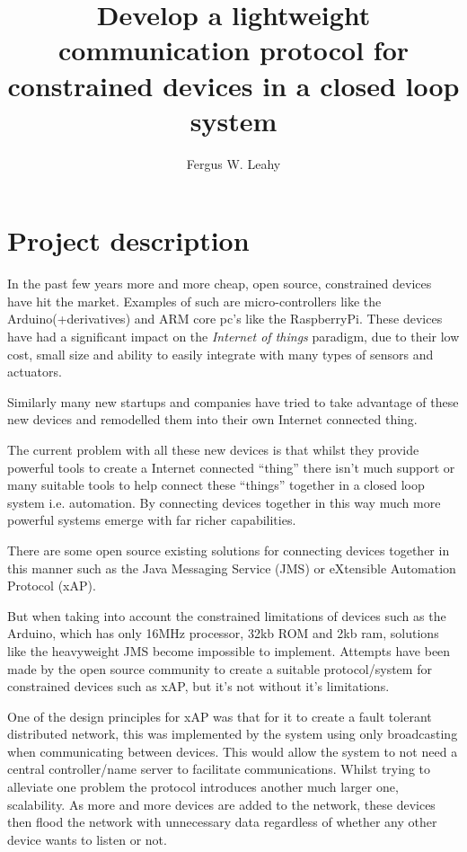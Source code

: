 \documentclass[a4paper,twocolumn]{article}
\title{Develop a lightweight communication protocol for constrained devices in a closed loop system}
\author{Fergus W. Leahy}
\begin{document}
\maketitle

\section{Project description} %
\label{sec:project_description}
In the past few years more and more cheap, open source, constrained devices have hit the market. Examples of such are micro-controllers like the Arduino(+derivatives)\cite{arduino} and ARM core pc's like the RaspberryPi\cite{pi}. These devices have had a significant impact on the \emph{Internet of things} paradigm, due to their low cost, small size and ability to easily integrate with many types of sensors and actuators.

Similarly many new startups and companies have tried to take advantage of these new devices and remodelled them into their own Internet connected thing.\cite{smart}\cite{twine}

The current problem with all these new devices is that whilst they provide powerful tools to create a Internet connected ``thing'' there isn't much support or many suitable tools to help connect these ``things'' together in a closed loop system i.e. automation. 
By connecting devices together in this way much more powerful systems emerge with far richer capabilities.

There are some open source existing solutions for connecting devices together in this manner such as the Java Messaging Service (JMS) or eXtensible Automation Protocol (xAP)\cite{xap}. 

But when taking into account the constrained limitations of devices such as the Arduino, which has only 16MHz processor, 32kb ROM and 2kb ram, solutions like the heavyweight JMS become impossible to implement.
Attempts have been made by the open source community to create a suitable protocol/system for constrained devices such as xAP, but it's not without it's limitations.

One of the design principles for xAP was that for it to create a fault tolerant distributed network, this was implemented by the system using only broadcasting when communicating between devices. This would allow the system to not need a central controller/name server to facilitate communications.
Whilst trying to alleviate one problem the protocol introduces another much larger one, scalability. As more and more devices are added to the network, these devices then flood the network with unnecessary data regardless of whether any other device wants to listen or not. 
\end{document}
